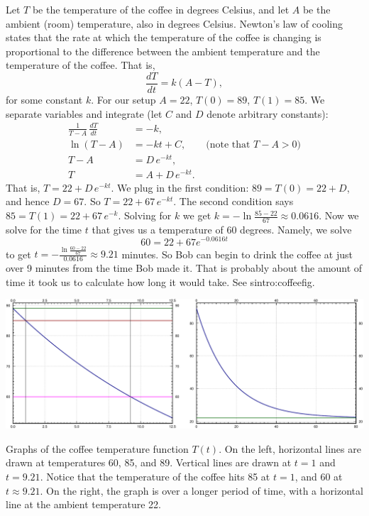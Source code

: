 \documentclass[10pt,aspectratio=169]{beamer}
\begin{document}
\begin{frame}
Let $T$ be the temperature of the coffee in degrees Celsius, and let $A$ be
the ambient (room) temperature, also in degrees Celsius.
Newton's law of cooling states that the rate at which the
temperature of the coffee is changing
is proportional to the difference between the
ambient temperature and the temperature of the coffee.  That is,
\begin{equation*}
\frac{dT}{dt} = k(A-T) ,
\end{equation*}
for some constant $k$.
For our setup $A=22$, $T(0) = 89$, $T(1) = 85$.
We separate variables and integrate (let $C$ and $D$ denote arbitrary
constants):
\begin{align*}
\frac{1}{T-A} \, \frac{dT}{dt} & = -k , \\
\ln (T-A) &= -kt + C , \qquad \text{(note that } T-A > 0 \text{)} \\
T-A &= D\, e^{-kt} ,  \\
T &= A + D\, e^{-kt} .
\end{align*}
That is,
$T = 22 + D\, e^{-kt}$.  We plug in the first condition: $89 = T(0) = 22 +
D$,
and hence $D = 67$.  So
$T = 22 + 67\, e^{-kt}$.  The second condition says $85 = T(1) = 
22 + 67\, e^{-k}$.  Solving for $k$ we get
$k = - \ln \frac{85-22}{67} \approx 0.0616$.  Now we solve for the time $t$
that gives us a temperature of 60 degrees.  Namely, we solve
\begin{equation*}
60 = 22 + 67 e^{-0.0616t}
\end{equation*}
to get
$t = - \frac{\ln \frac{60-22}{67}}{0.0616} \approx 9.21$ minutes.  So Bob can
begin to drink the coffee at just over 9 minutes from the time Bob made
it.  That is probably about the amount of time it took us to calculate how long
it would take.  See {sintro:coffeefig}.

\includegraphics[width=6.24in]{../figures/coffeefig-1-2}

Graphs of the coffee temperature function $T(t)$.
On the left, horizontal
lines are drawn at temperatures 60, 85, and 89.  Vertical lines
are drawn at $t=1$ and $t=9.21$.  Notice that the
temperature of the coffee hits 85 at $t=1$, and 60 at
$t \approx 9.21$.  On the right, the graph is over a longer period of time,
with a horizontal line at the ambient temperature 22.

\end{frame}
\end{document}
